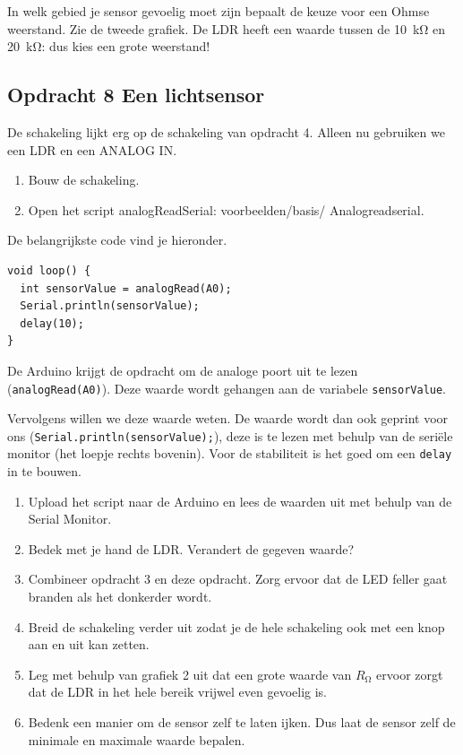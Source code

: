 \documentclass{arduino}
\begin{document}
In welk gebied je sensor gevoelig moet zijn bepaalt de keuze voor een Ohmse weerstand. Zie de tweede grafiek. De LDR heeft een waarde tussen de \SI{10}{\kilo\ohm} en \SI{20}{\kilo\ohm}: dus kies een grote weerstand!

\newpage

\subsection{Opdracht 8 Een lichtsensor}


De schakeling lijkt erg op de schakeling van opdracht 4. Alleen nu gebruiken we een LDR en een ANALOG IN.

\begin{enumerate}[label={\alph*})]
\item Bouw de schakeling.

\item Open het script analogReadSerial: voorbeelden/basis/ Analogreadserial.
\end{enumerate}

De belangrijkste code vind je hieronder.

\begin{lstlisting}
void loop() {
  int sensorValue = analogRead(A0);
  Serial.println(sensorValue);
  delay(10);
}
\end{lstlisting}

De Arduino krijgt de opdracht om de analoge poort uit te lezen (\lstinline{analogRead(A0)}). Deze waarde wordt gehangen aan de variabele \lstinline{sensorValue}. 

Vervolgens willen we deze waarde weten. De waarde wordt dan ook geprint voor ons (\lstinline{Serial.println(sensorValue);}), deze is te lezen met behulp van de seriële monitor (het loepje rechts bovenin). Voor de stabiliteit is het goed om een \lstinline{delay} in te bouwen.

\begin{enumerate}[label={\alph*})]
\item Upload het script naar de Arduino en lees de waarden uit met behulp van de Serial Monitor.

\item Bedek met je hand de LDR. Verandert de gegeven waarde?

\item Combineer opdracht 3 en deze opdracht. Zorg ervoor dat de LED feller gaat branden als het donkerder wordt.

\item Breid de schakeling verder uit zodat je de hele schakeling ook met een knop aan en uit kan zetten.

\item Leg met behulp van grafiek 2 uit dat een grote waarde van $R_{\si{\ohm}}$ ervoor zorgt dat de LDR in het hele bereik vrijwel even gevoelig is.

\item Bedenk een manier om de sensor zelf te laten ijken. Dus laat de sensor zelf de minimale en maximale waarde bepalen.
\end{enumerate}
\end{document}
